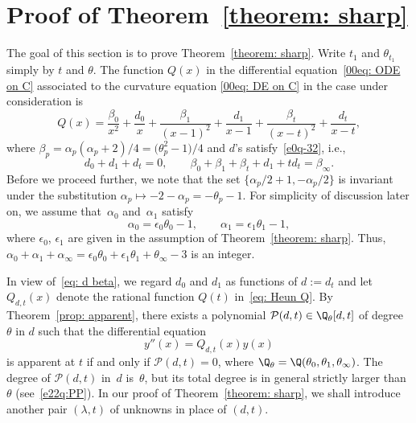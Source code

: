 \section{Proof of Theorem~\ref{theorem: sharp}}
\label{section: proof of Theorem 1.4}

The goal of this section is to prove Theorem~\ref{theorem: sharp}.
Write $t_1$ and $\theta_{t_1}$ simply by $t$ and $\theta$.
The function $Q(x)$ in the differential
equation~\eqref{00eq: ODE on C} associated to the curvature equation
\eqref{00eq: DE on C} in the case under consideration is
\begin{equation} \label{eq: Heun Q}
Q(x)=\frac{\beta_0}{x^2}+\frac{d_0}x
+\frac{\beta_1}{(x-1)^2}+\frac{d_1}{x-1}
+\frac{\beta_t}{(x-t)^2}+\frac{d_t}{x-t},
\end{equation}
where $\beta_p=\alpha_p(\alpha_p+2)/4=\bigl(\theta_p^2-1\bigr)/4$ and $d$'s
satisfy~\eqref{e0q-32}, i.e.,
\begin{equation} \label{eq: d beta}
d_0+d_1+d_t=0, \qquad
\beta_0+\beta_1+\beta_t+d_1+td_t=\beta_\infty.
\end{equation}
Before we proceed further, we note that the set
$\{\alpha_p/2+1,-\alpha_p/2\}$ is invariant under the substitution
$\alpha_p\mapsto-2-\alpha_p=-\theta_p-1$. For simplicity of discussion later on,
we assume that~$\alpha_0$ and~$\alpha_1$ satisfy
\begin{equation} \label{eq: choice of alpha}
\alpha_0=\epsilon_0\theta_0-1, \qquad
\alpha_1=\epsilon_1\theta_1-1,
\end{equation}
where $\epsilon_0$, $\epsilon_1$ are given in the assumption of Theorem~\ref{theorem: sharp}. Thus, $\alpha_0+\alpha_1+\alpha_\infty=\epsilon_0\theta_0
+\epsilon_1\theta_1+\theta_\infty-3$ is an integer.

In view of~\eqref{eq: d beta}, we regard $d_0$ and $d_1$ as
functions of $d:=d_t$ and let $Q_{d,t}(x)$ denote the rational function
$Q(t)$ in~\eqref{eq: Heun Q}. By Theorem~\ref{prop: apparent}, there
exists a polynomial $\mathcal P(d,t)\in\Q_{\theta}[d,t]$ of degree
$\theta$ in $d$ such that the differential equation
\begin{equation} \label{eq: Heun equation}
 y''(x)=Q_{d,t}(x)y(x)
\end{equation}
is apparent at $t$ if and only if $\mathcal P(d,t)=0$, where
$\Q_{\theta}=\Q(\theta_0,\theta_1,\theta_\infty)$. The degree of
$\mathcal P(d,t)$ in~$d$ is~$\theta$, but its total degree is in
general strictly larger than $\theta$ (see~\eqref{e22q:PP}).
In our proof of Theorem~\ref{theorem: sharp}, we shall introduce
another pair $(\lambda,t)$ of unknowns in place of $(d,t)$.

